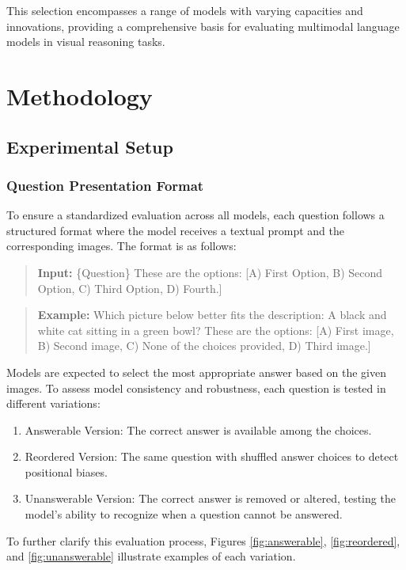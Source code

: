 This selection encompasses a range of models with varying capacities and innovations, providing a comprehensive basis for evaluating multimodal language models in visual reasoning tasks.

\section{Methodology}

\subsection{Experimental Setup}


\subsubsection{Question Presentation Format} 
To ensure a standardized evaluation across all models, each question follows a structured format where the model receives a textual prompt and the corresponding images. The format is as follows:

\begin{quote}
\textbf{Input:} \{Question\} These are the options: [A) First Option, B) Second Option, C) Third Option, D) Fourth.]
\end{quote}
\begin{quote}
\textbf{Example:} Which picture below better fits the description: A black and white cat sitting in a green bowl? These are the options: [A) First image, B) Second image, C) None of the choices provided, D) Third image.]
\end{quote}

Models are expected to select the most appropriate answer based on the given images. To assess model consistency and robustness, each question is tested in different variations:
\begin{enumerate}
    \item Answerable Version: The correct answer is available among the choices.
    \item Reordered Version: The same question with shuffled answer choices to detect positional biases.
    \item Unanswerable Version: The correct answer is removed or altered, testing the model’s ability to recognize when a question cannot be answered.
\end{enumerate}

To further clarify this evaluation process, Figures \ref{fig:answerable}, \ref{fig:reordered}, and \ref{fig:unanswerable} illustrate examples of each variation.

